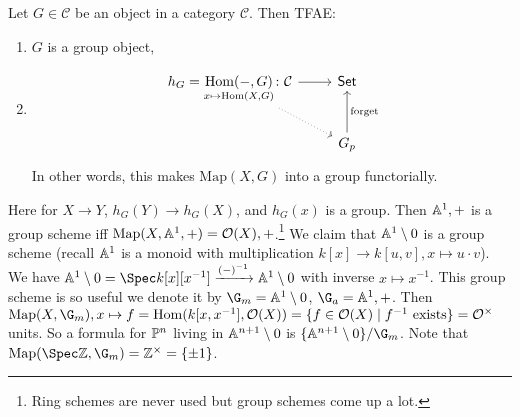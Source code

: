 \begin{prop}
    Let $G \in \mathcal{C} $ be an object in a category $\mathcal{C} $. Then TFAE:
    \begin{enumerate}[label=(\arabic*)]
    \setlength\itemsep{-.2em}
        \item $G$ is a group object,
        \item\[
                \begin{tikzcd}
{h_G=\underset{x \mapsto  \Hom(X,G)}{\Hom (-,G)} \colon \mathcal{C}} \arrow[rd, dotted] \arrow[r] & \mathsf{Set}                    \\
                                                                                                  & G_p \arrow[u, "\mathrm{forget}"']
\end{tikzcd}\] In other words, this makes $\mathrm{Map}(X,G)$ into a group functorially.
    \end{enumerate}\end{prop}
    Here for $X \to Y$, $h_G (Y) \to h_G(X)$, and $h_G(x)$ is a group. Then $\A^1,+$ is a group scheme iff $\mathrm{Map}(X,\A^1,+) = \mathcal{O} (X),+$.\footnote{Ring schemes are never used but group schemes come up a lot.} We claim that $\A^1 \setminus 0$ is a group scheme (recall $\A^1$ is a monoid with multiplication $k[x] \to k[u,v], x \mapsto  u\cdot v$). We have $\A^1 \setminus 0 = \Spec k[x][x ^{-1}] \xrightarrow{( - ) ^{-1}} \A^1 \setminus 0$ with inverse $x \mapsto  x ^{-1}$. This group scheme is so useful we denote it by $\G_m = \A^1 \setminus 0$, $\G_a = \A^1 ,+$. Then $\mathrm{Map}(X,\G_m) , x \mapsto  f = \Hom(k[x,x ^{-1}], \mathcal{O} (X)) =  \{ f \in \mathcal{O} (X) \mid  f ^{-1} \ \text{exists} \} = \mathcal{O} ^{\times }$ units. So a formula for $\P^n $ living  in $\A ^{n+1} \setminus 0 $ is $\{\A ^{n+1} \setminus 0\} / \G_m$. Note that $\mathrm{Map}(\Spec \Z, \G_m) = \Z ^{\times }=\{ \pm 1\} $.
